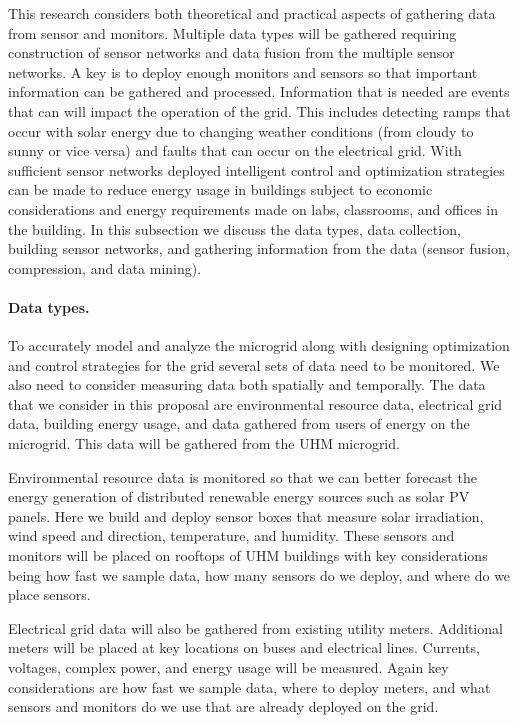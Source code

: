 This research considers both theoretical and practical aspects of gathering
data from sensor and monitors.  Multiple data types will be gathered
requiring construction of sensor networks and data fusion from the multiple
sensor networks.  A key is to deploy enough monitors and sensors so that
important information can be gathered and processed.  Information that is
needed are events that can will impact the operation of the grid.  This
includes detecting ramps that occur with solar energy due to changing
weather conditions (from cloudy to sunny or vice versa) and faults that can
occur on the electrical grid.  With sufficient sensor networks deployed
intelligent control and optimization strategies can be made to reduce
energy usage in buildings subject to economic considerations and energy
requirements made on labs, classrooms, and offices in the building.  In
this subsection we discuss the data types, data collection, building sensor
networks, and gathering information from the data (sensor fusion,
compression, and data mining).
 
\paragraph{Data types.}
 
To accurately model and analyze the microgrid along with designing
optimization and control strategies for the grid several sets of data need
to be monitored.  We also need to consider measuring data both spatially
and temporally.  The data that we consider in this proposal are
environmental resource data, electrical grid data, building energy usage,
and data gathered from users of energy on the microgrid.  This data will
be gathered from the UHM microgrid.
 
Environmental resource data is monitored so that we can better forecast the
energy generation of distributed renewable energy sources such as solar PV
panels.  Here we build and deploy sensor boxes that measure solar
irradiation, wind speed and direction, temperature, and humidity.  These
sensors and monitors will be placed on rooftops of UHM buildings with key
considerations being how fast we sample data, how many sensors do we
deploy, and where do we place sensors.
 
Electrical grid data will also be gathered from existing utility meters.
Additional meters will be placed at key locations on buses and electrical
lines.  Currents, voltages, complex power, and energy usage will be
measured.  Again key considerations are how fast we sample data, where to
deploy meters, and what sensors and monitors do we use that are already
deployed on the grid.
 
